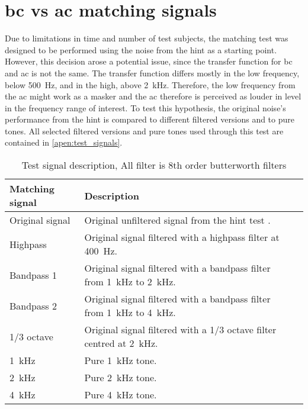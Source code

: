 \chapter*{\gls{bc} vs \gls{ac} matching signals}
\label{apend_matching_signals}
Due to limitations in time and number of test subjects, the matching test was designed to be performed using the noise from the \gls{hint} as a starting point. However, this decision arose a potential issue, since the transfer function for \gls{bc} and \gls{ac} is not the same. The transfer function differs mostly in the low frequency, below \SI{500}{\hertz}, and in the high, above \SI{2}{\kilo\hertz}. Therefore, the low frequency from the \gls{ac} might work as a masker and the \gls{ac} therefore is perceived as louder in level in the frequency range of interest. To test this hypothesis, the original noise's performance from the \gls{hint} is compared to different filtered versions and to pure tones. All selected filtered versions and pure tones used through this test are contained in \autoref{apen:test_signals}. 


\begin{table}[H]
\caption{Test signal description, All filter is 8th order butterworth filters}
\begin{tabularx}{\textwidth}{l | X l}
Matching signal       & Description \\ \hline
Original signal         & Original unfiltered signal from the \gls{hint} test \citep{hint_2011}.      \\
Highpass        & Original signal filtered with a highpass filter at \SI{400}{\hertz}.           \\
Bandpass 1        & Original signal filtered with a bandpass filter from \SI{1}{\kilo\hertz} to \SI{2}{\kilo\hertz}.           \\
Bandpass 2        & Original signal filtered with a bandpass filter from \SI{1}{\kilo\hertz} to \SI{4}{\kilo\hertz}.          \\
1/3 octave & Original signal filtered with a 1/3 octave filter centred at \SI{2}{\kilo\hertz}.          \\
\SI{1}{\kilo\hertz}                  & Pure \SI{1}{\kilo\hertz} tone.      \\
\SI{2}{\kilo\hertz}                 & Pure \SI{2}{\kilo\hertz} tone.          \\
\SI{4}{\kilo\hertz}                 & Pure \SI{4}{\kilo\hertz} tone.        
\end{tabularx}
\label{apen:test_signals}
\end{table}

